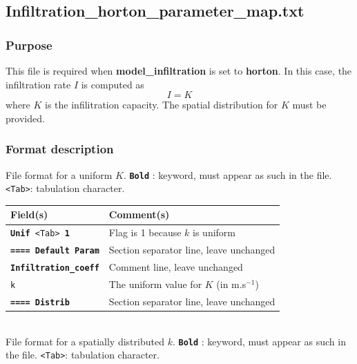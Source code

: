 \subsection{Infiltration\_horton\_parameter\_map.txt}
\subsubsection{Purpose}
This file is required when \textbf{model\_infiltration} is set to \textbf{horton}. In this case, the infiltration rate $I$ is computed as
\begin{equation}
I = K
\end{equation} where $K$ is the infilitration capacity. The spatial distribution for $K$ must be provided.
%
\subsubsection{Format description}
File format for a uniform $K$.  
\texttt{\textbf{Bold}} : keyword, must appear as such in the file. \texttt{<Tab>}: tabulation character. \\
    \begin{tabular}{p{6cm} | p{9cm}}
    \hline
    Field(s) & Comment(s) \\
    \hline  \hline
    \texttt{\textbf{Unif} <Tab> \textbf{1}} & Flag is 1 because $k$ is uniform \\ 
    \hline
    \texttt{\textbf{==== Default Param}} & Section separator line, leave unchanged \\
    \hline
    \texttt{\textbf{Infiltration\_coeff}} & Comment line, leave unchanged \\  
    \hline
    \texttt{k} & The uniform value for $K$ (in m.s$^{-1}$) \\ 
    \hline
    \texttt{\textbf{==== Distrib}} & Section separator line, leave unchanged \\  
    \hline
    \end{tabular}
%
\vspace{10mm} \\
%
File format for a spatially distributed $k$.  
\texttt{\textbf{Bold}} : keyword, must appear as such in the file. \texttt{<Tab>}: tabulation character. \\

